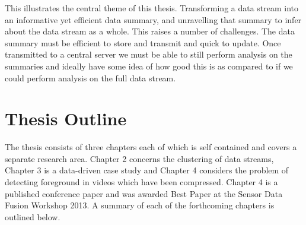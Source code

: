 This illustrates the central theme of this thesis. Transforming a data stream into an informative yet efficient data summary, and unravelling that summary to infer about the data stream as a whole. This raises a number of challenges. The data summary must be efficient to store and transmit and quick to update. Once transmitted to a central server we must be able to still perform analysis on the summaries and ideally have some idea of how good this is as compared to if we could perform analysis on the full data stream. 





\section{Thesis Outline}
\label{sec:outline}
The thesis consists of three chapters each of which is self contained and covers a separate research area. Chapter 2 concerns the clustering of data streams, Chapter 3 is a data-driven case study and Chapter 4 considers the problem of detecting foreground in videos which have been compressed. Chapter 4 is a published conference paper \citep{Davies2013} and was awarded Best Paper at the Sensor Data Fusion Workshop 2013. A summary of each of the forthcoming chapters is outlined below. 

